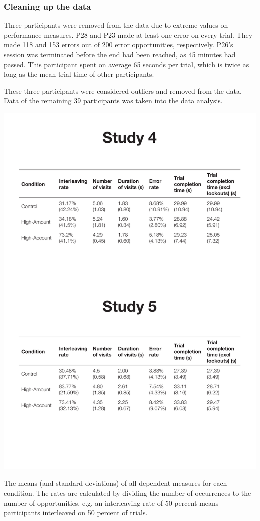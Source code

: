\subsubsection{Cleaning up the data}
Three participants were removed from the data due to extreme values on performance measures.
P28 and P23 made at least one error on every trial. They made 118 and 153 errors out of 200 error opportunities, respectively. P26's session was terminated before the end had been reached, as 45 minutes had passed. This participant spent on average 65 seconds per trial, which is twice as long as the mean trial time of other participants.

These three participants were considered outliers and removed from the data. Data of the remaining 39 participants was taken into the data analysis.

\begin{table}
 \includegraphics[width=\textwidth]{images/ch34/ch34_5-means.pdf}
\caption{The means (and standard deviations) of all dependent measures for each condition. The rates are calculated by dividing the number of occurrences to the number of opportunities, e.g. an interleaving rate of 50 percent means participants interleaved on 50 percent of trials.}
\label{tbl:ch34_5-means}
\end{table}


